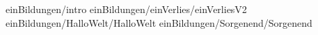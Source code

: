 
 {einBildungen/intro}
 {einBildungen/einVerlies/einVerliesV2} 
 {einBildungen/HalloWelt/HalloWelt}
 {einBildungen/Sorgenend/Sorgenend}  


